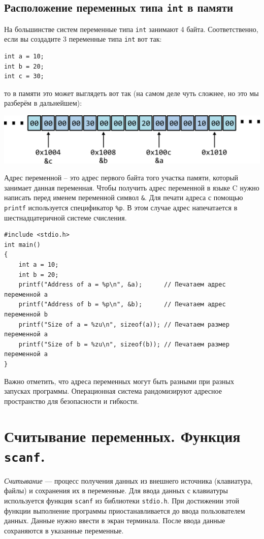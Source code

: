 \documentclass{article}
\begin{document}
\subsection*{Расположение переменных типа \texttt{int} в памяти}
На большинстве систем переменные типа \texttt{int} занимают 4 байта. Соответственно, если вы создадите 3 переменные типа \texttt{int} вот так:
\begin{lstlisting}
int a = 10;
int b = 20;
int c = 30;
\end{lstlisting}
то в памяти это может выглядеть вот так (на самом деле чуть сложнее, но это мы разберём в дальнейшем):
\begin{center}
\includegraphics[scale=1]{../images/memory2.png}
\end{center}
Адрес переменной -- это адрес первого байта того участка памяти, который занимает данная переменная.
Чтобы получить адрес переменной в языке C нужно написать перед именем переменной символ \texttt{\&}.
Для печати адреса с помощью \texttt{printf} используется спецификатор \texttt{\%p}. 
В этом случае адрес напечатается в шестнадцатеричной системе счисления.
\begin{lstlisting}
#include <stdio.h>
int main()
{
    int a = 10;
    int b = 20;
    printf("Address of a = %p\n", &a);    	// Печатаем адрес переменной a
    printf("Address of b = %p\n", &b);    	// Печатаем адрес переменной b
    printf("Size of a = %zu\n", sizeof(a));	// Печатаем размер переменной a
    printf("Size of b = %zu\n", sizeof(b));	// Печатаем размер переменной a
}
\end{lstlisting}
Важно отметить, что адреса переменных могут быть разными при разных запусках программы. Операционная система рандомизируют адресное пространство для безопасности и гибкости.


\section*{Считывание переменных. Функция \texttt{scanf}.}
\textit{Считывание} — процесс получения данных из внешнего источника (клавиатура, файлы) и сохранения их в переменные.
Для ввода данных с клавиатуры используется функция \texttt{scanf} из библиотеки \texttt{stdio.h}. При достижении этой функции выполнение программы приостанавливается до ввода пользователем данных. Данные нужно ввести в экран терминала. После ввода данные сохраняются в указанные переменные.
\end{document}
